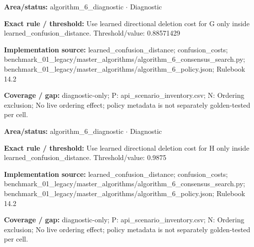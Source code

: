 \begin{tcolorbox}[enhanced,breakable,colback=white,colframe=Muted!45,boxrule=0.45pt,arc=1.5pt,left=6pt,right=6pt,top=5pt,bottom=5pt,title={\texttt{A6-LEARNED-DELETION-G}},title after break={\texttt{A6-LEARNED-DELETION-G}\ (continued)},fonttitle=\headingfont\bfseries\color{Navy},coltitle=Navy]
\textbf{Area/status:} algorithm\_\allowbreak{}6\_\allowbreak{}diagnostic $\boldsymbol{\cdot}$ Diagnostic\par
\smallskip
\textbf{Exact rule / threshold:} Use learned directional deletion cost for G only inside learned\_\allowbreak{}confusion\_\allowbreak{}distance. Threshold/\allowbreak{}value: 0.88571429\par
\smallskip
\textbf{Implementation source:} learned\_\allowbreak{}confusion\_\allowbreak{}distance; confusion\_\allowbreak{}costs; benchmark\_\allowbreak{}01\_\allowbreak{}legacy/\allowbreak{}master\_\allowbreak{}algorithms/\allowbreak{}algorithm\_\allowbreak{}6\_\allowbreak{}consensus\_\allowbreak{}search.py; benchmark\_\allowbreak{}01\_\allowbreak{}legacy/\allowbreak{}master\_\allowbreak{}algorithms/\allowbreak{}algorithm\_\allowbreak{}6\_\allowbreak{}policy.json; Rulebook 14.2\par
\smallskip
\textbf{Coverage / gap:} diagnostic-only; P: api\_\allowbreak{}scenario\_\allowbreak{}inventory.csv; N: Ordering exclusion; No live ordering effect; policy metadata is not separately golden-tested per cell.
\end{tcolorbox}
\begin{tcolorbox}[enhanced,breakable,colback=white,colframe=Muted!45,boxrule=0.45pt,arc=1.5pt,left=6pt,right=6pt,top=5pt,bottom=5pt,title={\texttt{A6-LEARNED-DELETION-H}},title after break={\texttt{A6-LEARNED-DELETION-H}\ (continued)},fonttitle=\headingfont\bfseries\color{Navy},coltitle=Navy]
\textbf{Area/status:} algorithm\_\allowbreak{}6\_\allowbreak{}diagnostic $\boldsymbol{\cdot}$ Diagnostic\par
\smallskip
\textbf{Exact rule / threshold:} Use learned directional deletion cost for H only inside learned\_\allowbreak{}confusion\_\allowbreak{}distance. Threshold/\allowbreak{}value: 0.9875\par
\smallskip
\textbf{Implementation source:} learned\_\allowbreak{}confusion\_\allowbreak{}distance; confusion\_\allowbreak{}costs; benchmark\_\allowbreak{}01\_\allowbreak{}legacy/\allowbreak{}master\_\allowbreak{}algorithms/\allowbreak{}algorithm\_\allowbreak{}6\_\allowbreak{}consensus\_\allowbreak{}search.py; benchmark\_\allowbreak{}01\_\allowbreak{}legacy/\allowbreak{}master\_\allowbreak{}algorithms/\allowbreak{}algorithm\_\allowbreak{}6\_\allowbreak{}policy.json; Rulebook 14.2\par
\smallskip
\textbf{Coverage / gap:} diagnostic-only; P: api\_\allowbreak{}scenario\_\allowbreak{}inventory.csv; N: Ordering exclusion; No live ordering effect; policy metadata is not separately golden-tested per cell.
\end{tcolorbox}
